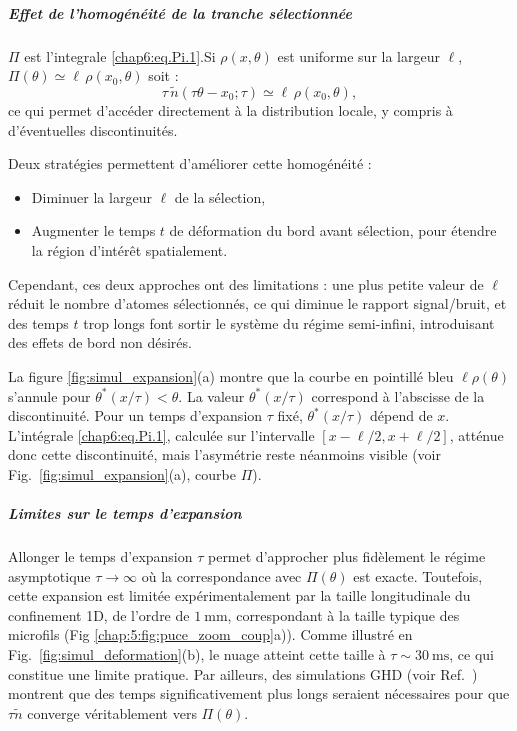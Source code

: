 \subparagraph{Effet de l’homogénéité de la tranche sélectionnée}

$\Pi$ est l'integrale \eqref{chap6:eq.Pi.1}.Si $\rho(x,\theta)$ est uniforme sur la largeur $\ell$, $\Pi(\theta) \simeq \ell\, \rho(x_0,\theta) $ soit :
\begin{equation}
 \tau\, \tilde{n}(\tau \theta - x_0 ; \tau) \simeq \ell\, \rho(x_0,\theta),
\end{equation}
ce qui permet d’accéder directement à la distribution locale, y compris à d’éventuelles discontinuités.

\medskip

Deux stratégies permettent d’améliorer cette homogénéité :
\begin{itemize}[label = $\bullet$] 
    \item Diminuer la largeur $\ell$ de la sélection,
    \item Augmenter le temps $t$ de déformation du bord avant sélection, pour étendre la région d’intérêt spatialement.
\end{itemize}
Cependant, ces deux approches ont des limitations : une plus petite valeur de $\ell$ réduit le nombre d’atomes sélectionnés, ce qui diminue le rapport signal/bruit, et des temps $t$ trop longs font sortir le système du régime semi-infini, introduisant des effets de bord non désirés.

\medskip

La figure \ref{fig:simul_expansion}(a) montre que la courbe en pointillé bleu $\ell \rho (\theta)$ s’annule pour $ \theta^\ast(x/\tau) < \theta $. La valeur $\theta^\ast(x/\tau)$ correspond à l’abscisse de la discontinuité. Pour un temps d’expansion $\tau$ fixé, $\theta^\ast(x/\tau)$ dépend de $x$. L’intégrale \eqref{chap6:eq.Pi.1}, calculée sur l’intervalle $[x - \ell/2, x + \ell/2]$, atténue donc cette discontinuité, mais l’asymétrie reste néanmoins visible (voir Fig.~\ref{fig:simul_expansion}(a), courbe $\Pi$).

\subparagraph{Limites sur le temps d’expansion}

Allonger le temps d’expansion $\tau$ permet d’approcher plus fidèlement le régime asymptotique $\tau \to \infty$ où la correspondance avec $\Pi(\theta)$ est exacte. Toutefois, cette expansion est limitée expérimentalement par la taille longitudinale du confinement 1D, de l’ordre de $1~\mathrm{mm}$, correspondant à la taille typique des  microfils (Fig \ref{chap:5:fig:puce_zoom_coup}a)). Comme illustré en Fig.~\ref{fig:simul_deformation}(b), le nuage atteint cette taille à $\tau \sim 30~\mathrm{ms}$, ce qui constitue une limite pratique. Par ailleurs, des simulations GHD (voir Ref.~\cite{dubois_probing_2024}) montrent que des temps significativement plus longs seraient nécessaires pour que $\tau \tilde{n}$ converge véritablement vers $\Pi(\theta)$.

